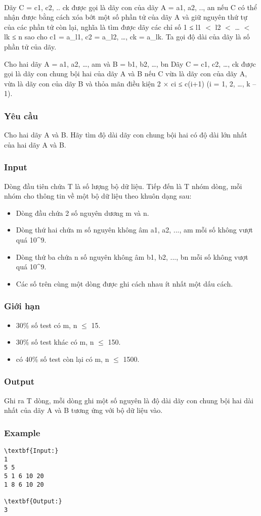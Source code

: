 

 

Dãy C = c1, c2, .. ck được gọi là dãy con của dãy A = a1, a2, .., an nếu C có thể nhận được bằng cách xóa bớt một số phần tử của dãy A và giữ nguyên thứ tự của các phần tử còn lại, nghĩa là tìm được dãy các chỉ số 1 ≤ l1 $<$ l2 $<$ … $<$ lk ≤ n sao cho c1 = a\_l1, c2 = a\_l2, …, ck = a\_lk. Ta gọi độ dài của dãy là số phần tử của dãy.

Cho hai dãy A = a1, a2, …, am và B = b1, b2, …, bn Dãy C = c1, c2, …, ck được gọi là dãy con chung bội hai của dãy A và B nếu C vừa là dãy con của dãy A, vừa là dãy con của dãy B và thỏa mãn điều kiện 2 × ci ≤ c(i+1) (i = 1, 2, …, k – 1).

\subsubsection{Yêu cầu}

Cho hai dãy A và B. Hãy tìm độ dài dãy con chung bội hai có độ dài lớn nhất của hai dãy A và B.

\subsubsection{Input}

Dòng đầu tiên chứa T là số lượng bộ dữ liệu. Tiếp đến là T nhóm dòng, mỗi nhóm cho thông tin về một bộ dữ liệu theo khuôn dạng sau:
\begin{itemize}
	\item Dòng đầu chứa 2 số nguyên dương m và n.
	\item Dòng thứ hai chứa m số nguyên không âm a1, a2, ..., am mỗi số không vượt quá 10^9.
	\item Dòng thứ ba chứa n số nguyên không âm b1, b2, ..., bn mỗi số không vượt quá 10^9.
	\item Các số trên cùng một dòng được ghi cách nhau ít nhất một dấu cách.
\end{itemize}

\subsubsection{Giới hạn}
\begin{itemize}
	\item 30\% số test có m, n  $\le$  15.
	\item 30\% số test khác có m, n  $\le$  150.
	\item có 40\% số test còn lại có m, n  $\le$  1500.
\end{itemize}

\subsubsection{Output}

Ghi ra T dòng, mỗi dòng ghi một số nguyên là độ dài dãy con chung bội hai dài nhất của dãy A và B tương ứng với bộ dữ liệu vào.

\subsubsection{Example}
\begin{verbatim}
\textbf{Input:}
1
5 5
5 1 6 10 20
1 8 6 10 20

\textbf{Output:}
3
\end{verbatim}
